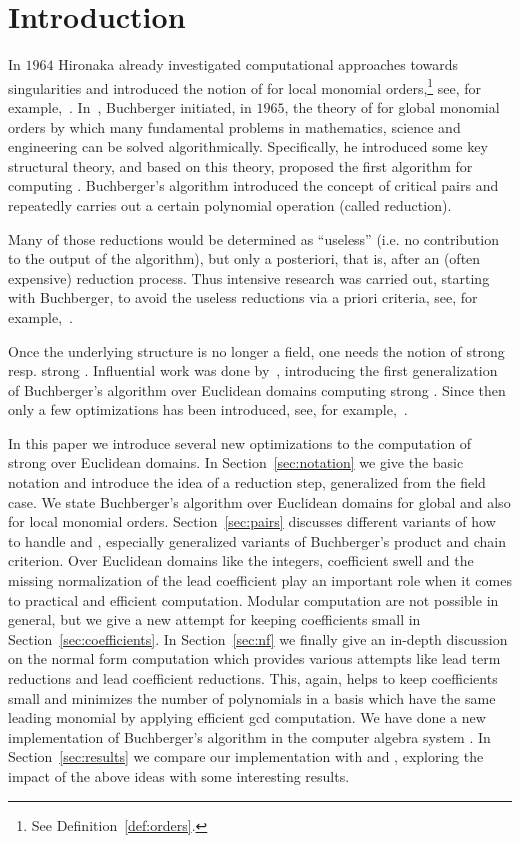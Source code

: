 \section{Introduction}
\label{sec:intro} In $1964$ Hironaka already investigated
computational approaches towards singularities and introduced the notion of
\stbs for local monomial orders,\footnote{See Definition~\ref{def:orders}.} see, for
example,~\cite{hironaka11964, hironaka21964, grauert1972}.
In~\cite{bGroebner1965, bGroebner1965eng}, Buchberger initiated, in $1965$, the theory
of \gbs for global monomial orders by which many fundamental problems in mathematics, science
and engineering can be solved algorithmically. Specifically, he introduced some key
structural theory, and based on
this theory, proposed the first algorithm for computing \gbs.
Buchberger's algorithm introduced the concept of critical pairs and repeatedly carries out a certain
polynomial operation (called reduction).

Many of those reductions would be
determined as ``useless'' (i.e. no contribution to the output of the algorithm),
but only a posteriori, that is, after an (often expensive) reduction process.
Thus intensive research was carried out, starting with Buchberger, to avoid the
useless reductions via a priori criteria, see,  for
example,~\cite{bGroebnerCriterion1979,buchberger2ndCriterion1985,gmInstallation1988}.

Once the underlying structure is no longer a field, one needs
the notion of strong \gbs resp. strong \stbs. Influential work was done
by~\cite{kapur1988}, introducing the first generalization of Buchberger's
algorithm over Euclidean domains computing strong \gbs. Since then only a few
optimizations has been introduced, see, for example,~\cite{Wienand2011,
    lichtblau2012, eppSigZ2017}.

In this paper we introduce several new optimizations to the computation of
strong \stbs over Euclidean domains. In Section~\ref{sec:notation} we give the
basic notation and introduce the idea of a reduction step, generalized from the
field case. We state
Buchberger's algorithm over Euclidean domains for global and also for local
monomial orders. Section~\ref{sec:pairs} discusses different variants of how to
handle \spts and \gpts, especially generalized variants of Buchberger's product
and chain criterion. Over Euclidean domains like the integers, coefficient swell
and the missing normalization of the lead coefficient play an important role when it
comes to practical and efficient computation. Modular computation are not
possible in general, but we give a new attempt for keeping coefficients small
in Section~\ref{sec:coefficients}. In Section~\ref{sec:nf} we finally give an
in-depth discussion on the normal form computation which provides various attempts
like lead term reductions and lead coefficient reductions. This, again, helps to keep coefficients small and
minimizes the number of polynomials in a basis which have the same
leading monomial by applying efficient gcd computation.
We have done a new implementation of Buchberger's algorithm in the computer
algebra system \singular. In Section~\ref{sec:results} we compare our implementation
with \macaulay and \magma, exploring the impact of the above ideas with
some interesting results.
